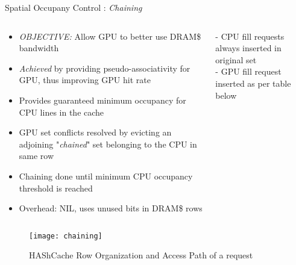 \documentclass[final,t]{beamer}
\newcommand*\circled[1]{\tikz[baseline=(char.base)]{
            \node[shape=circle,draw,inner sep=2pt] (char) {#1};}}
\begin{document}
\begin{frame}[t,fragile]{}
\begin{columns}[t]
\begin{column}{.47\linewidth}
    \begin{exampleblock}{\circled{2} Spatial Occupany Control : \textit{Chaining}}
    \begin{columns} [T]
    \begin{column}{0.6\linewidth}    
    	\begin{itemize}
	    	\item \emph{OBJECTIVE:} Allow GPU to better use DRAM\$ bandwidth
		    \item \emph{Achieved} by providing pseudo-associativity for GPU, thus improving GPU hit rate
		    \item Provides guaranteed minimum occupancy for CPU lines in the cache
	    	\item GPU set conflicts resolved by evicting an adjoining "\textit{chained}" set belonging to the CPU in same row
		    \item Chaining done until minimum CPU occupancy threshold is reached
		    \item Overhead: NIL, uses unused bits in DRAM\$ rows
	    \end{itemize}
	\end{column}
	\begin{column}{0.4\linewidth}
		\scriptsize
		- CPU fill requests always inserted in original set\\
		- GPU fill request inserted as per table below\\
		\begin{table}[]
		\centering
			
		\end{table}
	\end{column}
	\end{columns}
	\vspace{\baselineskip}
    \centering
    \begin{figure}
    	\texttt{[image: chaining]}
    	\caption{HAShCache Row Organization and Access Path of a request}
    \end{figure}
    \end{exampleblock}
    
       
\end{column}

\end{columns}


\end{frame}
\end{document}
